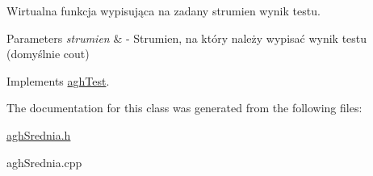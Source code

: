 \-Wirtualna funkcja wypisująca na zadany strumien wynik testu. 


\begin{DoxyParams}{\-Parameters}
{\em strumien} & -\/ \-Strumien, na który należy wypisać wynik testu (domyślnie cout) \\
\hline
\end{DoxyParams}


\-Implements \hyperlink{classaghTest_ad43c3c9a98d652936d9a5fe90aa1b57b}{agh\-Test}.



\-The documentation for this class was generated from the following files\-:\begin{DoxyCompactItemize}
\item 
\hyperlink{aghSrednia_8h}{agh\-Srednia.\-h}\item 
agh\-Srednia.\-cpp\end{DoxyCompactItemize}
